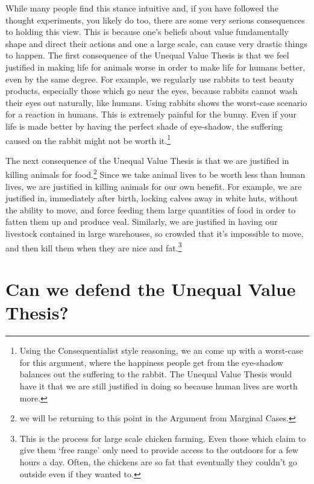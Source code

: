 While many people find this stance intuitive and, if you have followed the thought experiments, you likely do too, there are some very serious consequences to holding this view. This is because one's beliefs about value fundamentally shape and direct their actions and one a large scale, can cause very drastic things to happen. The first consequence of the Unequal Value Thesis is that we feel justified in making life for animals worse in order to make life for humans better, even by the same degree. For example, we regularly use rabbits to test beauty products, especially those which go near the eyes, because rabbits cannot wash their eyes out naturally, like humans. Using rabbits shows the worst-case scenario for a reaction in humans. This is extremely painful for the bunny. Even if your life is made better by having the perfect shade of eye-shadow, the suffering caused on the rabbit might not be worth it.\footnote{Using the Consequentialist style reasoning, we an come up with a worst-case for this argument, where the happiness people get from the eye-shadow balances out the suffering to the rabbit. The Unequal Value Thesis would have it that we are still justified in doing so because human lives are worth more.}

The next consequence of the Unequal Value Thesis is that we are justified in killing animals for food.\footnote{we will be returning to this point in the Argument from Marginal Cases.} Since we take animal lives to be worth less than human lives, we are justified in killing animals for our own benefit. For example, we are justified in, immediately after birth, locking calves away in white huts, without the ability to move, and force feeding them large quantities of food in order to fatten them up and produce veal. Similarly, we are justified in having our livestock contained in large warehouses, so crowded that it's impossible to move, and then kill them when they are nice and fat.\footnote{This is the process for large scale chicken farming. Even those which claim to give them `free range' only need to provide access to the outdoors for a few hours a day. Often, the chickens are so fat that eventually they couldn't go outside even if they wanted to.} 


\section{Can we defend the Unequal Value Thesis?}

